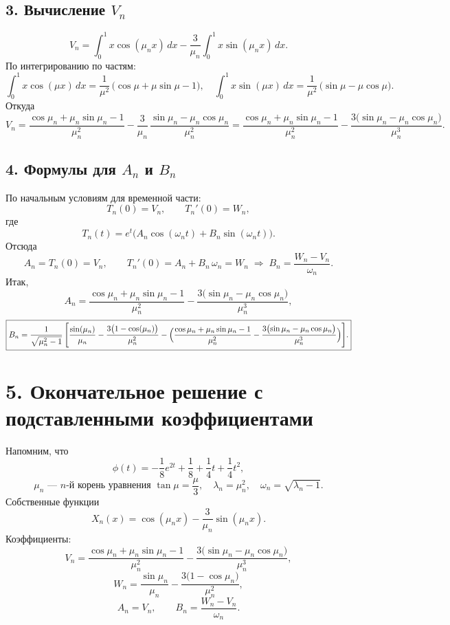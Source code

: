 \documentclass[a4paper,12pt]{article}
\begin{document}
\subsection*{3. Вычисление $V_n$}

\[
V_n
= \int_{0}^{1} x\cos(\mu_n x)\,dx
  - \frac{3}{\mu_n}\int_{0}^{1} x\sin(\mu_n x)\,dx.
\]
По интегрированию по частям:
\[
\int_{0}^{1} x\cos(\mu x)\,dx
= \frac{1}{\mu^2}\,\bigl(\cos\mu + \mu\sin\mu - 1\bigr),
\quad
\int_{0}^{1} x\sin(\mu x)\,dx
= \frac{1}{\mu^2}\,\bigl(\sin\mu - \mu\cos\mu\bigr).
\]
Откуда
\[
\boxed{
V_n
= \frac{\cos\mu_n + \mu_n\sin\mu_n - 1}{\mu_n^2}
- \frac{3}{\mu_n}\,\frac{\sin\mu_n - \mu_n\cos\mu_n}{\mu_n^2}
= \frac{\cos\mu_n + \mu_n\sin\mu_n - 1}{\mu_n^2}
- \frac{3\bigl(\sin\mu_n - \mu_n\cos\mu_n\bigr)}{\mu_n^3}.
}
\]

\subsection*{4. Формулы для $A_n$ и $B_n$}

По начальным условиям для временной части:
\[
T_n(0)=V_n,\qquad T_n'(0)=W_n,
\]
где
\[
T_n(t) = e^t\bigl(A_n\cos(\omega_n t) + B_n\sin(\omega_n t)\bigr).
\]
Отсюда
\[
A_n = T_n(0) = V_n,
\qquad
T_n'(0) = A_n + B_n\,\omega_n = W_n
\;\Longrightarrow\;
B_n = \frac{W_n - V_n}{\omega_n}.
\]
Итак,
\[
\boxed{
A_n
= \frac{\cos\mu_n + \mu_n\sin\mu_n - 1}{\mu_n^2}
- \frac{3\bigl(\sin\mu_n - \mu_n\cos\mu_n\bigr)}{\mu_n^3},
}
\]
\[
\boxed{
B_n
= \frac{1}{\sqrt{\mu_n^2-1}}\,
\Biggl[
\frac{\sin(\mu_n)}{\mu_n}
- \frac{3\bigl(1-\cos(\mu_n)\bigr)}{\mu_n^2}
- \Bigl(\frac{\cos\mu_n + \mu_n\sin\mu_n - 1}{\mu_n^2}
- \frac{3\bigl(\sin\mu_n - \mu_n\cos\mu_n\bigr)}{\mu_n^3}\Bigr)
\Biggr].
}
\]

\section*{5. Окончательное решение с подставленными коэффициентами}

Напомним, что
\[
\phi(t) = -\frac{1}{8}e^{2t} + \frac{1}{8} + \frac{1}{4}t + \frac{1}{4}t^2,
\]
\[
\mu_n \text{ --- $n$-й корень уравнения } \tan\mu = \frac{\mu}{3}, 
\quad \lambda_n = \mu_n^2,\quad \omega_n = \sqrt{\lambda_n - 1}.
\]
Собственные функции
\[
X_n(x) = \cos(\mu_n x) - \frac{3}{\mu_n}\sin(\mu_n x).
\]
Коэффициенты:
\[
V_n = \frac{\cos\mu_n + \mu_n\sin\mu_n - 1}{\mu_n^2}
      - \frac{3\bigl(\sin\mu_n - \mu_n\cos\mu_n\bigr)}{\mu_n^3},
\]
\[
W_n = \frac{\sin\mu_n}{\mu_n}
      - \frac{3\bigl(1-\cos\mu_n\bigr)}{\mu_n^2},
\]
\[
A_n = V_n,
\qquad
B_n = \frac{W_n - V_n}{\omega_n}.
\]
\end{document}
